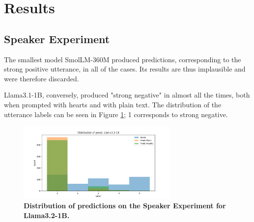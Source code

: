 \documentclass[11pt]{article}
\begin{document}







\section{Results}
\label{sec:res}


\subsection{Speaker Experiment}

The smallest model SmolLM-360M produced predictions, corresponding to the strong positive utterance, in all of the cases. Its results are thus implausible and were therefore discarded.

Llama3.1-1B, conversely, produced "strong negative" in almost all the times, both when prompted with hearts and with plain text. The distribution of the utterance labels can be seen in Figure \ref{fig:exp2-overall}; 1 corresponds to strong negative. 

\begin{figure}[t]
    \centering
    \includegraphics[width=0.7\textwidth]{plots/speaker_experiment/llama3.2-1B_distribution}
    \caption{\textbf{Distribution of predictions on the Speaker Experiment for Llama3.2-1B.}}
    \label{fig:exp2-overall}
\end{figure}
\end{document}
